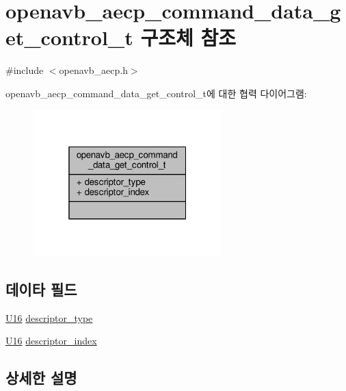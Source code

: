 \hypertarget{structopenavb__aecp__command__data__get__control__t}{}\section{openavb\+\_\+aecp\+\_\+command\+\_\+data\+\_\+get\+\_\+control\+\_\+t 구조체 참조}
\label{structopenavb__aecp__command__data__get__control__t}


{\ttfamily \#include $<$openavb\+\_\+aecp.\+h$>$}



openavb\+\_\+aecp\+\_\+command\+\_\+data\+\_\+get\+\_\+control\+\_\+t에 대한 협력 다이어그램\+:
\nopagebreak
\begin{figure}[H]
\begin{center}
\leavevmode
\includegraphics[width=208pt]{structopenavb__aecp__command__data__get__control__t__coll__graph}
\end{center}
\end{figure}
\subsection*{데이타 필드}
\begin{DoxyCompactItemize}
\item 
\hyperlink{openavb__types__base__pub_8h_a0a0a322d5fa4a546d293a77ba8b4a71f}{U16} \hyperlink{structopenavb__aecp__command__data__get__control__t_a1e231d7874aada5925b29affc76782cc}{descriptor\+\_\+type}
\item 
\hyperlink{openavb__types__base__pub_8h_a0a0a322d5fa4a546d293a77ba8b4a71f}{U16} \hyperlink{structopenavb__aecp__command__data__get__control__t_ab26fb363c24b9a2a4391f9171c981b08}{descriptor\+\_\+index}
\end{DoxyCompactItemize}


\subsection{상세한 설명}


